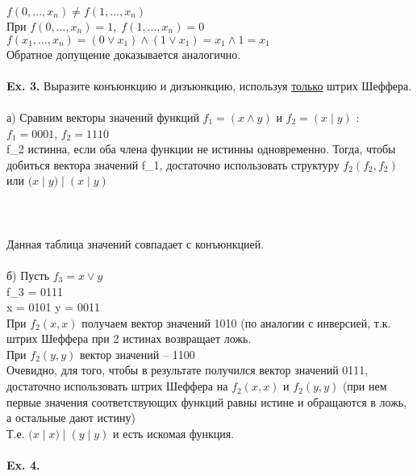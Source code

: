 $ f(0, ... , x_n) \neq f(1, ... , x_n) $
\\
При $ f(0, ... , x_n) = 1,\; f(1, ... , x_n) = 0 $
\\
$ f(x_1, ... , x_n) = (0 \vee x_1) \wedge (1 \vee x_1) = x_1 \wedge 1 = x_1 $
\\
Обратное допущение доказывается аналогично.
\\
\\
\textbf{Ex. 3.} Выразите конъюнкцию и дизъюнкцию, используя \underline{только} штрих Шеффера.
\\
\\
а) Сравним векторы значений функций $ f_1 = ( x \wedge y) $ и $ f_2 = (x \; | \; y) $ :
\\
$ f_1 = 0001 $, $ f_2 = 1110$
\\
f_2 истинна, если оба члена функции не истинны одновременно. Тогда, чтобы добиться вектора значений f_1, достаточно использовать структуру $ f_2( f_2, f_2) $ или $ (x  \; | \; y) \; | \; (x \; | \; y) $
\\
\\
\\
\\
Данная таблица значений совпадает с конъюнкцией.
\\
\\
б) Пусть $ f_3 = x \vee y $
\\
f_3 = 0111
\\
x = 0101
y = 0011
\\
При $ f_2 (x, x) $ получаем вектор значений 1010 (по аналогии с инверсией, т.к. штрих Шеффера при 2 истинах возвращает ложь.
\\
При $ f_2 (y, y) $ вектор значений -- 1100
\\
Очевидно, для того, чтобы в результате получился вектор значений 0111, достаточно использовать штрих Шеффера на $ f_2 (x, x) $ и $ f_2 (y, y) $ (при нем первые значения соответствующих функций равны истине и обращаются в ложь, а остальные дают истину)
\\
Т.е. $(x \; | \; x) \; | \; (y \; | \; y)$ и есть искомая функция.
\\
\\
\textbf{Ex. 4.}